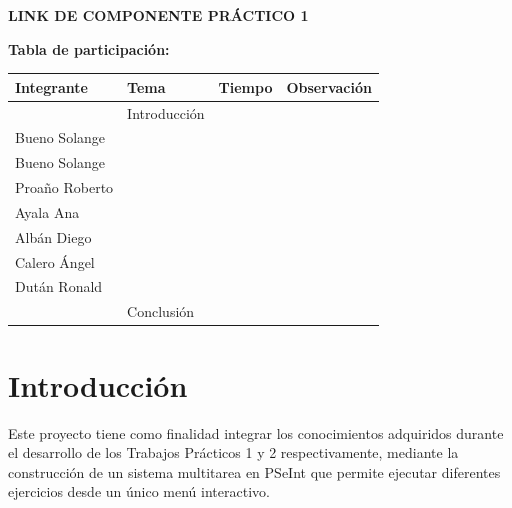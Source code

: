 \documentclass[12pt,a4paper]{article}
\begin{document}
	
	
	\newpage
	
	\begin{center}
		{\Large\bfseries LINK DE COMPONENTE PRÁCTICO 1}
	\end{center}
	
	\vspace{3cm}
	
	\begin{center}
		{\bfseries Tabla de participación:}
	\end{center}
	
	\vspace{0.5cm}
	
	\begin{center}
		\begin{tabular}{|p{4cm}|p{4cm}|p{3cm}|p{4cm}|}
			\hline
			\textbf{Integrante} & \textbf{Tema} & \textbf{Tiempo} & \textbf{Observación} \\ \hline
			& Introducción & & \\ \hline
			Bueno Solange & & & \\ \hline
			Bueno Solange & & & \\ \hline
			Proaño Roberto & & & \\ \hline
			Ayala Ana & & & \\ \hline
			Albán Diego & & & \\ \hline
			Calero Ángel & & & \\ \hline
			Dután Ronald & & & \\ \hline
			& Conclusión & & \\ \hline
		\end{tabular}
	\end{center}
	
	
	
	\newpage
	\section{\textcolor{azulUNEMI}{Introducción}}
	
	
	Este proyecto tiene como finalidad integrar los conocimientos adquiridos durante el desarrollo de los Trabajos Prácticos 1 y 2 respectivamente, mediante la construcción de un sistema multitarea en PSeInt que permite ejecutar diferentes ejercicios desde un único menú interactivo.
	
\end{document}
